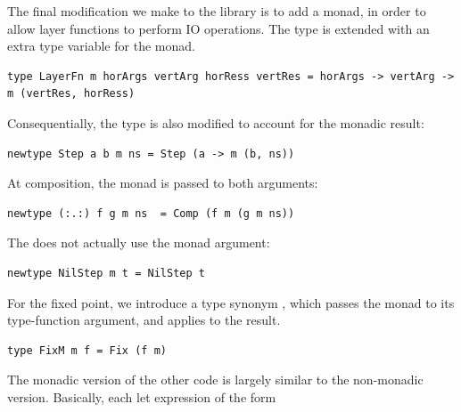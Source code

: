 \documentclass{llncs}
\begin{document}
The final modification we make to the library is to add a monad, in order to allow layer functions to perform IO operations. The type  is extended with an extra type variable  for the monad.

\begin{small}
\begin{verbatim}
type LayerFn m horArgs vertArg horRess vertRes = horArgs -> vertArg -> m (vertRes, horRess)
\end{verbatim}
\end{small}

Consequentially, the  type is also modified to account for the monadic result:

\begin{small}
\begin{verbatim}
newtype Step a b m ns = Step (a -> m (b, ns))
\end{verbatim}
\end{small}

At composition, the monad is passed to both arguments:

\begin{small}
\begin{verbatim}
newtype (:.:) f g m ns  = Comp (f m (g m ns))
\end{verbatim}
\end{small}

The  does not actually use the monad argument:

\begin{small}
\begin{verbatim}
newtype NilStep m t = NilStep t
\end{verbatim}
\end{small}

For the fixed point, we introduce a type synonym , which passes the monad to its type-function argument, and applies  to the result.

\begin{small}
\begin{verbatim}
type FixM m f = Fix (f m)
\end{verbatim}
\end{small}

The monadic version of the other code is largely similar to the non-monadic version. Basically, each let expression of the form\\

\noindent
{}\\
\end{document}
